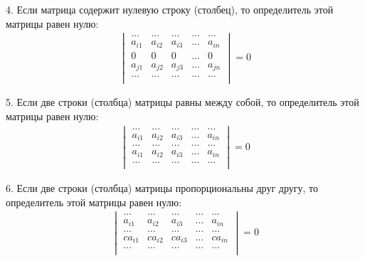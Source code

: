 \documentclass[a4paper,12pt]{extbook}
\theoremstyle{named}
\theoremstyle{named}
\begin{document}
4. Если матрица содержит нулевую строку (столбец), то определитель этой матрицы равен нулю:
\begin{gather*}
    \begin{vmatrix}
        \dots  & \dots  & \dots  & \dots & \dots  \\
        a_{i1} & a_{i2} & a_{i3} & \dots & a_{in} \\
        0      & 0      & 0      & \dots & 0      \\
        a_{j1} & a_{j2} & a_{j3} & \dots & a_{jn} \\
        \dots  & \dots  & \dots  & \dots & \dots  \\
    \end{vmatrix}
    = 0
\end{gather*}

5. Если две строки (столбца) матрицы равны между собой, то определитель этой матрицы равен нулю:
\begin{gather*}
    \begin{vmatrix}
        \dots  & \dots  & \dots  & \dots & \dots  \\
        a_{i1} & a_{i2} & a_{i3} & \dots & a_{in} \\
        \dots  & \dots  & \dots  & \dots & \dots  \\
        a_{i1} & a_{i2} & a_{i3} & \dots & a_{in} \\
        \dots  & \dots  & \dots  & \dots & \dots  \\
    \end{vmatrix}
    = 0
\end{gather*}

6. Если две строки (столбца) матрицы пропорциональны друг другу, то определитель этой матрицы равен нулю:
\begin{gather*}
    \begin{vmatrix}
        \dots   & \dots   & \dots   & \dots & \dots   \\
        a_{i1}  & a_{i2}  & a_{i3}  & \dots & a_{in}  \\
        \dots   & \dots   & \dots   & \dots & \dots   \\
        ca_{i1} & ca_{i2} & ca_{i3} & \dots & ca_{in} \\
        \dots   & \dots   & \dots   & \dots & \dots   \\
    \end{vmatrix}
    = 0
\end{gather*}
\end{document}
